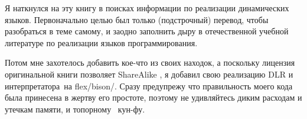 \secdown{}

Я наткнулся на эту книгу в поисках информации по реализации динамических языков.
Первоначально целью был только (подстрочный) перевод, чтобы разобраться в теме
самому, и заодно заполнить дыру в отечественной учебной литературе по реализации
языков программирования.

Потом мне захотелось добавить кое-что из своих находок, а поскольку лицензия
оригинальной книги
позволяет ShareAlike , я добавил свою реализацию
DLR
и интерпретатора\ на flex/bison/\cpp. Сразу предупрежу что правильность моего кода была
принесена в жертву его простоте, поэтому не удивляйтесь диким расходам и утечкам
памяти, и топорному \cpp\ кун-фу.

\secup